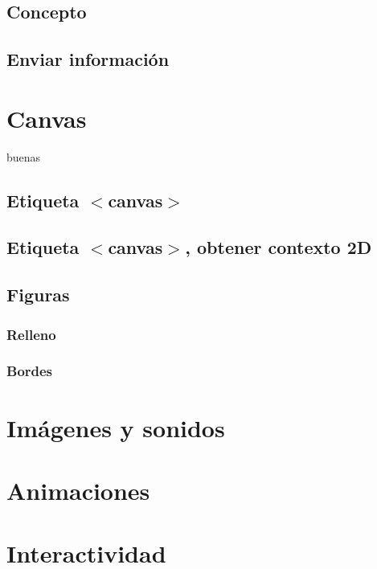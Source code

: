 \documentclass[12pt]{report}
\begin{document}
		\subsection{Concepto}
		\subsection{Enviar información}
	\section{Canvas}
		buenas
		\subsection{Etiqueta $<$canvas$>$}
		\subsection{Etiqueta $<$canvas$>$, obtener contexto 2D}
		\subsection{Figuras}
			\subsubsection{Relleno}
			\subsubsection{Bordes}
	\section{Imágenes y sonidos}
	\section{Animaciones}
	\section{Interactividad}
\end{document}
